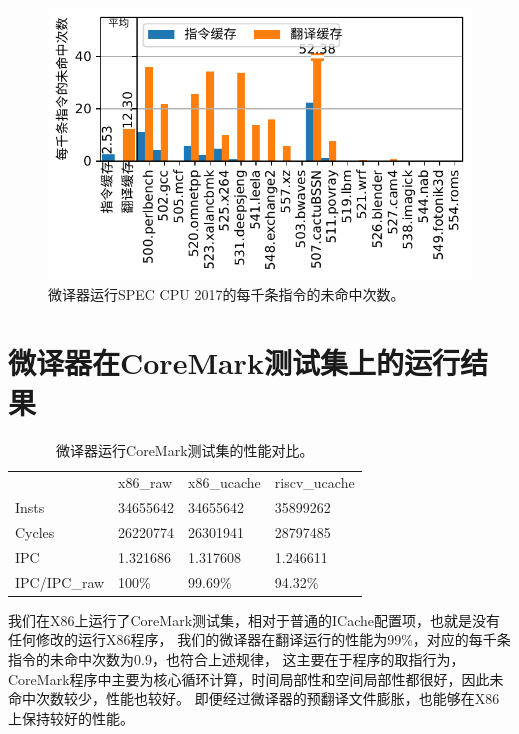 \begin{figure}[h]
  \centering
  \includegraphics[width=1\linewidth]{./plot/new_cache_miss.pdf}
  \caption{微译器运行SPEC CPU 2017的每千条指令的未命中次数。}
  \label{img:new_cache_miss}
\end{figure}

\section{微译器在CoreMark测试集上的运行结果}

\begin{table}[]
  \centering
  \caption{
    微译器运行CoreMark测试集的性能对比。
  }
  \label{tab:coremark}
  \begin{tabular}{llll}
  \rowcolor[HTML]{FFCE93} 
               & x86\_raw & x86\_ucache & riscv\_ucache \\
  Insts        & 34655642 & 34655642    & 35899262      \\
  Cycles       & 26220774 & 26301941    & 28797485      \\
  IPC          & 1.321686 & 1.317608    & 1.246611      \\
  IPC/IPC\_raw & 100\%    & 99.69\%     & 94.32\%      
  \end{tabular}
  \end{table}

我们在X86上运行了CoreMark测试集，相对于普通的ICache配置项，也就是没有任何修改的运行X86程序，
我们的微译器在翻译运行的性能为99\%，对应的每千条指令的未命中次数为0.9，也符合上述规律，
这主要在于程序的取指行为，CoreMark程序中主要为核心循环计算，时间局部性和空间局部性都很好，因此未命中次数较少，性能也较好。
即便经过微译器的预翻译文件膨胀，也能够在X86上保持较好的性能。

